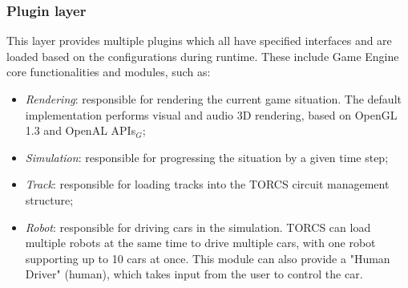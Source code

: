 \subsubsection{Plugin layer}
This layer provides multiple plugins which all have specified interfaces and are loaded based on the configurations during runtime. These include Game Engine core functionalities and modules, such as:
\begin{itemize}
	\item \textit{Rendering}: responsible for rendering the current game situation. The default implementation performs visual and audio 3D rendering, based on OpenGL 1.3 and OpenAL APIs$_G$;
	\item \textit{Simulation}: responsible for progressing the situation by a given time step;
	\item \textit{Track}: responsible for loading tracks into the TORCS circuit management structure;
	\item \textit{Robot}: responsible for driving cars in the simulation. TORCS can load multiple robots at the same time to drive multiple cars, with one robot supporting up to 10 cars at once. This module can also provide a "Human Driver" (human), which takes input from the user to control the car.
\end{itemize}

